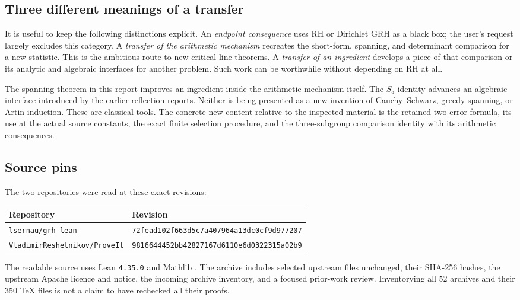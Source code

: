 \subsection{Three different meanings of a transfer}

It is useful to keep the following distinctions explicit.
An \emph{endpoint consequence} uses RH or Dirichlet GRH as a black box; the
user's request largely excludes this category. A \emph{transfer of the
arithmetic mechanism} recreates the short-form, spanning, and determinant
comparison for a new statistic. This is the ambitious route to new
critical-line theorems. A \emph{transfer of an ingredient} develops a piece
of that comparison or its analytic and algebraic interfaces for another
problem. Such work can be worthwhile without depending on RH at all.

The spanning theorem in this report improves an ingredient inside the
arithmetic mechanism itself. The $S_5$ identity advances an algebraic
interface introduced by the earlier reflection reports. Neither is being
presented as a new invention of Cauchy--Schwarz, greedy spanning, or Artin
induction. These are classical tools. The concrete new content relative to
the inspected material is the retained two-error formula, its use at the
actual source constants, the exact finite selection procedure, and the
three-subgroup comparison identity with its arithmetic consequences.

\subsection{Source pins}

The two repositories were read at these exact revisions:
\begin{center}\small
\begin{tabular}{ll}
\toprule
Repository & Revision\\
\midrule
\texttt{lsernau/grh-lean} & \texttt{72fead102f663d5c7a407964a13dc0cf9d977207}\\
\texttt{VladimirReshetnikov/ProveIt} & \texttt{9816644452bb42827167d6110e6d0322315a02b9}\\
\bottomrule
\end{tabular}
\end{center}
The readable source uses Lean \texttt{4.35.0} and Mathlib
.
The archive includes selected upstream files unchanged, their SHA-256
hashes, the upstream Apache licence and notice, the incoming archive
inventory, and a focused prior-work review. Inventorying all 52 archives
and their 350 TeX files is not a claim to have rechecked all their proofs.
